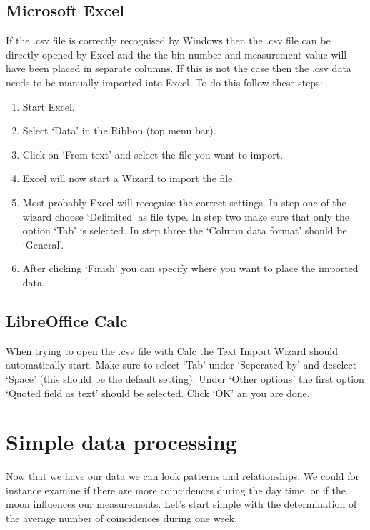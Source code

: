 \subsection{Microsoft Excel}
If the .csv file is correctly recognised by Windows then the .csv file can be directly opened by Excel and the the bin number and measurement value will have been placed in separate columns. If this is not the case then the .csv data needs to be manually imported into Excel. To do this follow these steps:
\begin{enumerate}[1.]
\item Start Excel.
\item Select `Data' in the Ribbon (top menu bar).
\item Click on `From text' and select the file you want to import.
\item Excel will now start a Wizard to import the file.
\item Most probably Excel will recognise the correct settings. In step one of the wizard choose `Delimited' as file type. In step two make sure that only the option `Tab' is selected. In step three the `Column data format' should be `General'.
\item After clicking `Finish' you can specify where you want to place the imported data.
\end{enumerate}

\subsection{LibreOffice Calc}
When trying to open the .csv file with Calc the Text Import Wizard should automatically start. Make sure to select `Tab' under `Seperated by' and deselect `Space' (this should be the default setting). Under `Other options' the first option `Quoted field as text' should be selected. Click `OK' an you are done.

\section{Simple data processing}
Now that we have our data we can look patterns and relationships. We could for instance examine if there are more coincidences during the day time, or if the moon influences our measurements. Let's start simple with the determination of the average number of coincidences during one week.

